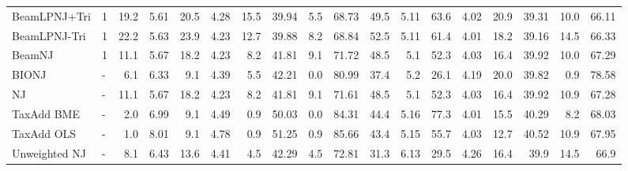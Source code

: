 \begin{tabular}{llrrrrrrrr|rrrrrrrr}
BeamLPNJ+Tri & 1 & 19.2 & 5.61 & 20.5 & 4.28 & 15.5 & 39.94 & 5.5 & 68.73 & 49.5 & 5.11 & 63.6 & 4.02 & 20.9 & 39.31 & 10.0 & 66.11 \\
BeamLPNJ-Tri & 1 & 22.2 & 5.63 & 23.9 & 4.23 & 12.7 & 39.88 & 8.2 & 68.84 & 52.5 & 5.11 & 61.4 & 4.01 & 18.2 & 39.16 & 14.5 & 66.33 \\
BeamNJ & 1 & 11.1 & 5.67 & 18.2 & 4.23 & 8.2 & 41.81 & 9.1 & 71.72 & 48.5 & 5.1 & 52.3 & 4.03 & 16.4 & 39.92 & 10.0 & 67.29 \\
BIONJ & - & 6.1 & 6.33 & 9.1 & 4.39 & 5.5 & 42.21 & 0.0 & 80.99 & 37.4 & 5.2 & 26.1 & 4.19 & 20.0 & 39.82 & 0.9 & 78.58 \\
NJ & - & 11.1 & 5.67 & 18.2 & 4.23 & 8.2 & 41.81 & 9.1 & 71.61 & 48.5 & 5.1 & 52.3 & 4.03 & 16.4 & 39.92 & 10.9 & 67.28 \\
TaxAdd BME & - & 2.0 & 6.99 & 9.1 & 4.49 & 0.9 & 50.03 & 0.0 & 84.31 & 44.4 & 5.16 & 77.3 & 4.01 & 15.5 & 40.29 & 8.2 & 68.03 \\
TaxAdd OLS & - & 1.0 & 8.01 & 9.1 & 4.78 & 0.9 & 51.25 & 0.9 & 85.66 & 43.4 & 5.15 & 55.7 & 4.03 & 12.7 & 40.52 & 10.9 & 67.95 \\
Unweighted NJ & - & 8.1 & 6.43 & 13.6 & 4.41 & 4.5 & 42.29 & 4.5 & 72.81 & 31.3 & 6.13 & 29.5 & 4.26 & 16.4 & 39.9 & 14.5 & 66.9 \\
\bottomrule
\end{tabular}
